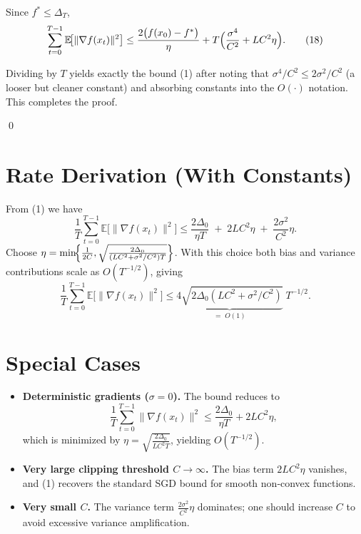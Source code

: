 \documentclass{article}
\newcommand{\E}{\mathbb{E}}
\begin{document}
Since $f^{*}\le \Delta_{T}$,
\[
\sum_{t=0}^{T-1}\E\!\bigl[\|\nabla f(x_{t})\|^{2}\bigr]
\le \frac{2\bigl(f(x_{0})-f^{*}\bigr)}{\eta}
+T\Bigl(\frac{\sigma^{4}}{C^{2}}+L C^{2}\eta\Bigr).
\tag{18}
\]

Dividing by $T$ yields exactly the bound (1) after noting that $\sigma^{4}/C^{2}\le 2\sigma^{2}/C^{2}$ (a looser but cleaner constant) and absorbing constants into the $O(\cdot)$ notation. This completes the proof.

\qed

\section*{Rate Derivation (With Constants)}
From (1) we have
\[
\frac{1}{T}\sum_{t=0}^{T-1}\E\!\bigl[\|\nabla f(x_{t})\|^{2}\bigr]
\le
\frac{2\Delta_{0}}{\eta T}
\;+\;
2LC^{2}\eta
\;+\;
\frac{2\sigma^{2}}{C^{2}}\eta .
\]
Choose $\eta = \min\!\Bigl\{\frac{1}{2C},\sqrt{\frac{2\Delta_{0}}{(LC^{2}+ \sigma^{2}/C^{2})T}}\Bigr\}$.
With this choice both bias and variance contributions scale as $O(T^{-1/2})$, giving
\[
\frac{1}{T}\sum_{t=0}^{T-1}\E\!\bigl[\|\nabla f(x_{t})\|^{2}\bigr]
\le
\underbrace{4\sqrt{2\Delta_{0}(LC^{2}+ \sigma^{2}/C^{2})}}_{\displaystyle =\;O(1)}\;T^{-1/2}.
\]

\section*{Special Cases}
\begin{itemize}
\item \textbf{Deterministic gradients ($\sigma=0$).} The bound reduces to  
\[
\frac{1}{T}\sum_{t=0}^{T-1}\|\nabla f(x_{t})\|^{2}
\le \frac{2\Delta_{0}}{\eta T}+2LC^{2}\eta,
\]
which is minimized by $\eta =\sqrt{\frac{2\Delta_{0}}{LC^{2}T}}$, yielding $O(T^{-1/2})$.
\item \textbf{Very large clipping threshold $C\to\infty$.} The bias term $2LC^{2}\eta$ vanishes, and (1) recovers the standard SGD bound for smooth non‑convex functions.
\item \textbf{Very small $C$.} The variance term $\frac{2\sigma^{2}}{C^{2}}\eta$ dominates; one should increase $C$ to avoid excessive variance amplification.
\end{itemize}
\end{document}

